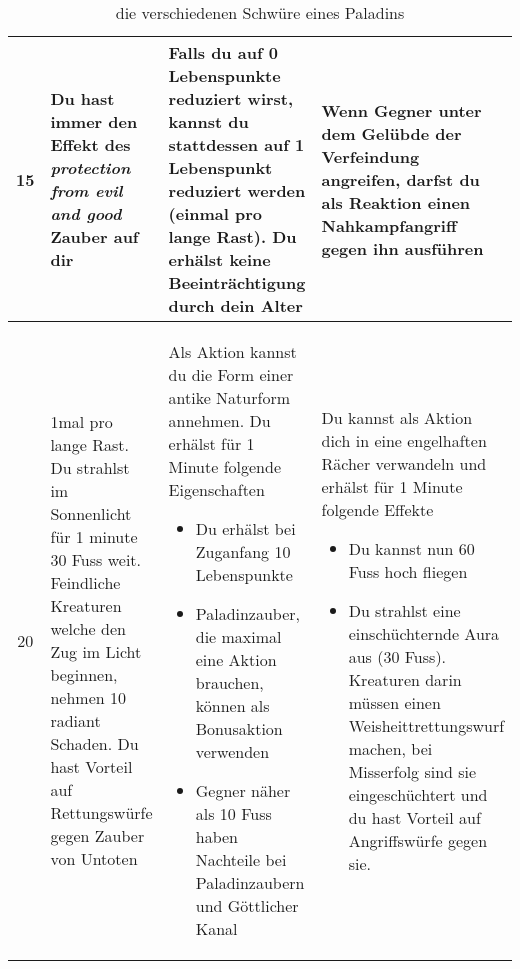 \begin{table}
\begin{tabular}{cp{6cm}p{6cm}p{6cm}}
	15 &
	Du hast immer den Effekt des \textit{protection from evil and good} Zauber auf dir&
	Falls du auf 0 Lebenspunkte reduziert wirst, kannst du stattdessen auf 1 Lebenspunkt reduziert werden (einmal pro lange Rast). Du erhälst keine Beeinträchtigung durch dein Alter&
 	Wenn Gegner unter dem Gelübde der Verfeindung angreifen, darfst du als Reaktion einen Nahkampfangriff gegen ihn ausführen\\ \hline
	
	20 &
	1mal pro lange Rast. Du strahlst im Sonnenlicht für 1 minute 30 Fuss weit. Feindliche Kreaturen welche den Zug im Licht beginnen, nehmen 10 radiant Schaden. Du hast Vorteil auf Rettungswürfe gegen Zauber von Untoten &
	Als Aktion kannst du die Form einer antike Naturform annehmen. Du erhälst für 1 Minute folgende Eigenschaften
	\begin{itemize}
		\item Du erhälst bei Zuganfang 10 Lebenspunkte
		\item Paladinzauber, die maximal eine Aktion brauchen, können als Bonusaktion verwenden
		\item Gegner näher als 10 Fuss haben Nachteile bei Paladinzaubern und Göttlicher Kanal
	\end{itemize}&
	Du kannst als Aktion dich in eine engelhaften Rächer verwandeln und erhälst für 1 Minute folgende Effekte
	\begin{itemize}
		\item Du kannst nun 60 Fuss hoch fliegen
		\item Du strahlst eine einschüchternde Aura aus (30 Fuss). Kreaturen darin müssen einen Weisheittrettungswurf machen, bei Misserfolg sind sie eingeschüchtert und du hast Vorteil auf Angriffswürfe gegen sie.
	\end{itemize}		
	\\ \hline	
	\end{tabular}
	\caption{die verschiedenen Schwüre eines Paladins}
\end{table}
